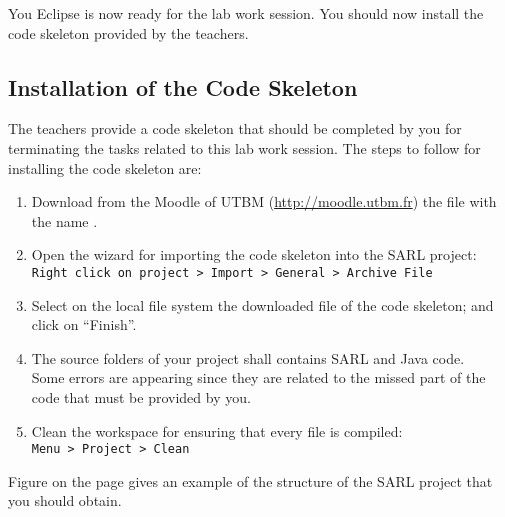 You Eclipse is now ready for the lab work session. You should now install the code skeleton provided by the teachers.

\subsection{Installation of the Code Skeleton}

The teachers provide a code skeleton that should be completed by you for terminating the tasks related to this lab work session.
The steps to follow for installing the code skeleton are:
\begin{enumerate}
\item Download from the Moodle of UTBM (\url{http://moodle.utbm.fr}) the file with the name \skeletonName.
\item Open the wizard for importing the code skeleton into the SARL project: \\
	\texttt{Right click on project > Import > General > Archive File}
\item Select on the local file system the downloaded file of the code skeleton; and click on ``Finish''.
\item The source folders of your project shall contains SARL and Java code. \\
	Some errors are appearing since they are related to the missed part of the code that must be provided by you. 
\item Clean the workspace for ensuring that every file is compiled: \\
	\texttt{Menu > Project > Clean}
\end{enumerate}

Figure  on the page  gives an example of the structure of the SARL project that you should obtain.


